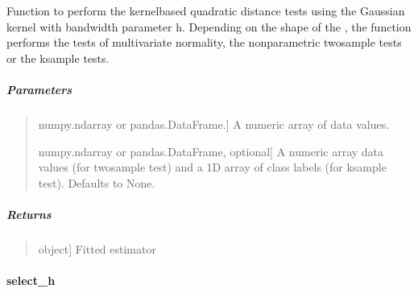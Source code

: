 \documentclass[letterpaper,10pt,english,openany,oneside]{sphinxmanual}
\begin{document}
\begin{fulllineitems}
\label{\detokenize{api_reference/generated/QuadratiK.kernel_test.KernelTest:QuadratiK.kernel_test.KernelTest.test}}
\pysigstartsignatures
{}
\pysigstopsignatures
\sphinxAtStartPar
Function to perform the kernel\sphinxhyphen{}based quadratic distance tests using 
the Gaussian kernel with bandwidth parameter h. 
Depending on the shape of the , the function performs the tests of 
multivariate normality, the non\sphinxhyphen{}parametric two\sphinxhyphen{}sample tests or the k\sphinxhyphen{}sample tests.


\subparagraph{Parameters}
\label{\detokenize{api_reference/generated/QuadratiK.kernel_test.KernelTest:id3}}\begin{quote}
\begin{description}
\sphinxlineitem{x}{[}numpy.ndarray or pandas.DataFrame.{]}
\sphinxAtStartPar
A numeric array of data values.

\sphinxlineitem{y}{[}numpy.ndarray or pandas.DataFrame, optional{]}
\sphinxAtStartPar
A numeric array data values (for two\sphinxhyphen{}sample test) and a 1D array of class labels 
(for k\sphinxhyphen{}sample test). Defaults to None.

\end{description}
\end{quote}


\subparagraph{Returns}
\label{\detokenize{api_reference/generated/QuadratiK.kernel_test.KernelTest:id4}}\begin{quote}
\begin{description}
\sphinxlineitem{self}{[}object{]}
\sphinxAtStartPar
Fitted estimator

\end{description}
\end{quote}

\end{fulllineitems}




\sphinxstepscope


\paragraph{select\_h}
\label{\detokenize{api_reference/generated/QuadratiK.kernel_test.select_h:select-h}}\label{\detokenize{api_reference/generated/QuadratiK.kernel_test.select_h::doc}}
\end{document}
